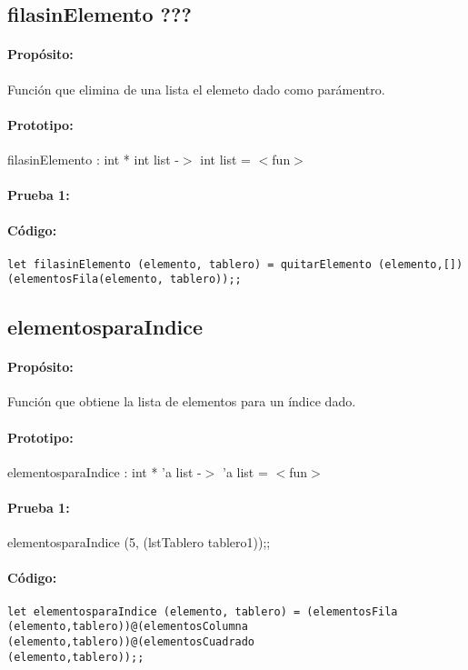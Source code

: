 \subsection{filasinElemento ???}

\paragraph{Propósito:} Función que elimina de una lista el elemeto dado como parámentro.
\paragraph{Prototipo:} filasinElemento : int * int list -$>$ int list = $<$fun$>$
\paragraph{Prueba 1:}
\paragraph{Código:}
\begin{verbatim}
let filasinElemento (elemento, tablero) = quitarElemento (elemento,[])
(elementosFila(elemento, tablero));;
\end{verbatim}

\subsection{elementosparaIndice}

\paragraph{Propósito:} Función que obtiene la lista de elementos para un índice dado.
\paragraph{Prototipo:} elementosparaIndice : int * 'a list -$>$ 'a list = $<$fun$>$
\paragraph{Prueba 1:} elementosparaIndice (5, (lstTablero tablero1));;
\paragraph{Código:}
\begin{verbatim}
let elementosparaIndice (elemento, tablero) = (elementosFila
(elemento,tablero))@(elementosColumna (elemento,tablero))@(elementosCuadrado
(elemento,tablero));;
\end{verbatim}

